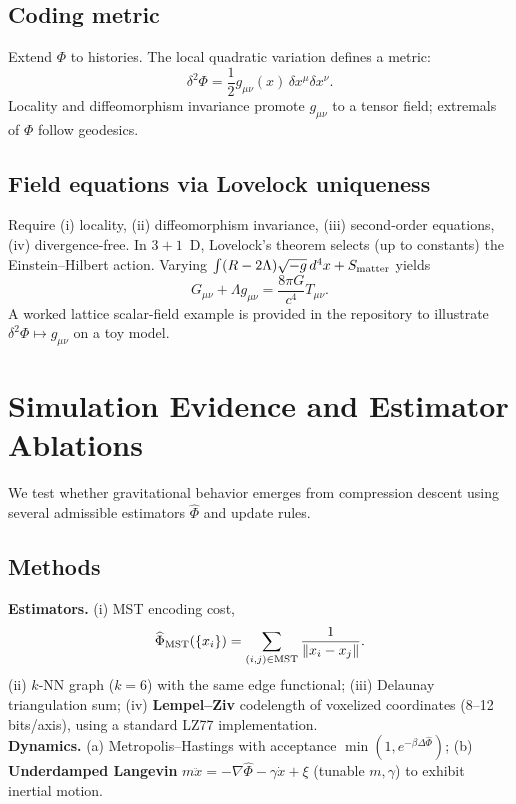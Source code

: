 \documentclass[aps,preprint,onecolumn,longbibliography,nofootinbib]{revtex4-2}
\numberwithin{equation}{section}        %
\begin{document}
\subsection{Coding metric}
Extend $\Phi$ to histories. The local quadratic variation defines a metric:
\begin{equation}
\delta^2\Phi = \frac{1}{2} g_{\mu\nu}(x)\,\delta x^\mu \delta x^\nu. \label{eq:metric}
\end{equation}
Locality and diffeomorphism invariance promote $g_{\mu\nu}$ to a tensor field; extremals of $\Phi$ follow geodesics.

\subsection{Field equations via Lovelock uniqueness}
Require (i) locality, (ii) diffeomorphism invariance, (iii) second-order equations, (iv) divergence-free. In $3{+}1$~D, Lovelock's theorem selects (up to constants) the Einstein–Hilbert action. Varying $\int (R-2\Lambda)\sqrt{-g}\,d^4x + S_{\rm matter}$ yields
\begin{equation}
G_{\mu\nu}+\Lambda g_{\mu\nu} = \frac{8\pi G}{c^4}T_{\mu\nu}. \label{eq:einstein}
\end{equation}
A worked lattice scalar-field example is provided in the repository to illustrate $\delta^2\Phi\mapsto g_{\mu\nu}$ on a toy model.

\section{Simulation Evidence and Estimator Ablations}
We test whether gravitational behavior emerges from compression descent using several admissible estimators $\widehat\Phi$ and update rules.

\subsection{Methods}
\textbf{Estimators.} (i) MST encoding cost,
\begin{equation}
\widehat\Phi_{\rm MST}(\{x_i\})=\sum_{(i,j)\in {\rm MST}}\frac{1}{\|x_i-x_j\|}. \label{eq:mst}
\end{equation}
(ii) $k$-NN graph ($k{=}6$) with the same edge functional; (iii) Delaunay triangulation sum; (iv) \textbf{Lempel–Ziv} codelength of voxelized coordinates (8–12 bits/axis), using a standard LZ77 implementation.\\
\textbf{Dynamics.} (a) Metropolis–Hastings with acceptance $\min(1,e^{-\beta\Delta\widehat\Phi})$; (b) \textbf{Underdamped Langevin} $m\ddot x = -\nabla \widehat\Phi - \gamma \dot x+\xi$ (tunable $m,\gamma$) to exhibit inertial motion.
\end{document}
